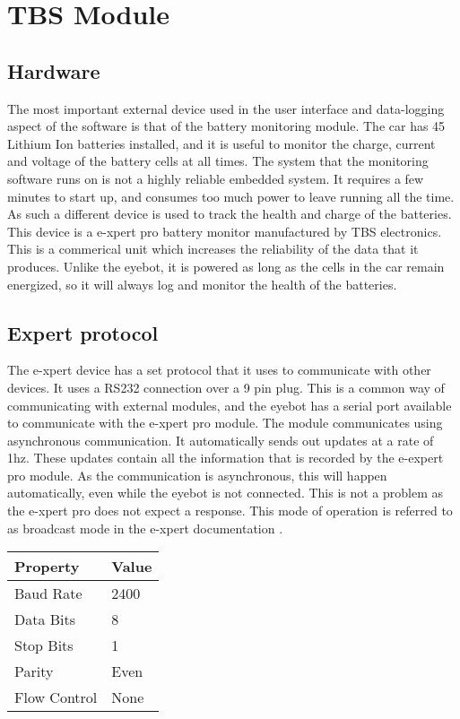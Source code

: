 

\section{TBS Module}

\subsection{Hardware}

The most important external device used in the user interface and data-logging aspect of the software is that of the battery monitoring module. The car has 45 Lithium Ion batteries installed, and it is useful to monitor the charge, current and voltage of the battery cells at all times. The system that the monitoring software runs on is not a highly reliable embedded system. It requires a few minutes to start up, and consumes too much power to leave running all the time. As such a different device is used to track the health and charge of the batteries. This device is a e-xpert pro battery monitor manufactured by TBS electronics. This is a commerical unit which increases the reliability of the data that it produces. Unlike the eyebot,  it is powered as long as the cells in the car remain energized, so it will always log and monitor the health of the batteries.

\subsection{E\-xpert protocol}

The e-xpert device has a set protocol that it uses to communicate with other devices. It uses a RS232 connection over a 9 pin plug. This is a common way of communicating with external modules, and the eyebot has a serial port available to communicate with the e-xpert pro module. The module communicates using asynchronous communication. It automatically sends out updates at a rate of 1hz\cite{e_xpert}. These updates contain all the information that is recorded by the e-expert pro module. As the communication is asynchronous, this will happen automatically, even while the eyebot is not connected. This is not a problem as the e-xpert pro does not expect a response. This mode of operation is referred to as broadcast mode in the e-xpert documentation \cite{e_xpert}.

\begin{table}
\begin{center}
    \begin{tabular}{|l|l|}
        \hline
        Property & Value \\ \hline
        Baud Rate    & 2400 \\
        Data Bits    & 8    \\ 
        Stop Bits    & 1    \\ 
        Parity       & Even \\ 
        Flow Control & None \\
        \hline
    \end{tabular}
\end{center}
\end{table}


